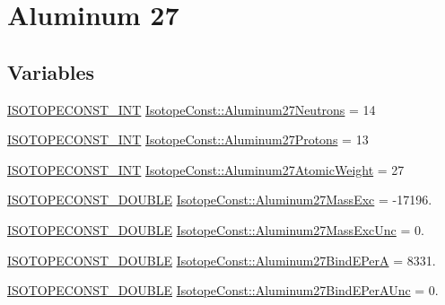 \hypertarget{group___isotope_const-_aluminum-_al27}{}\section{Aluminum 27}
\label{group___isotope_const-_aluminum-_al27}
\subsection*{Variables}
\begin{DoxyCompactItemize}
\item 
\mbox{\hyperlink{group___isotope_const-_macros_ga5f18360b3e99483a35c32d789e62621c}{I\+S\+O\+T\+O\+P\+E\+C\+O\+N\+S\+T\+\_\+\+I\+NT}} \mbox{\hyperlink{group___isotope_const-_aluminum-_al27_ga31e6e90dbeca94a5b2ed8e8935a1dfcc}{Isotope\+Const\+::\+Aluminum27\+Neutrons}} = 14
\item 
\mbox{\hyperlink{group___isotope_const-_macros_ga5f18360b3e99483a35c32d789e62621c}{I\+S\+O\+T\+O\+P\+E\+C\+O\+N\+S\+T\+\_\+\+I\+NT}} \mbox{\hyperlink{group___isotope_const-_aluminum-_al27_gabac87c2736616b008bdb04b44e209bfa}{Isotope\+Const\+::\+Aluminum27\+Protons}} = 13
\item 
\mbox{\hyperlink{group___isotope_const-_macros_ga5f18360b3e99483a35c32d789e62621c}{I\+S\+O\+T\+O\+P\+E\+C\+O\+N\+S\+T\+\_\+\+I\+NT}} \mbox{\hyperlink{group___isotope_const-_aluminum-_al27_gaf1c6ac9d88bcbaca1fdd812d435c244d}{Isotope\+Const\+::\+Aluminum27\+Atomic\+Weight}} = 27
\item 
\mbox{\hyperlink{group___isotope_const-_macros_ga8f45a7272ce02c0b4c65c44636ed719a}{I\+S\+O\+T\+O\+P\+E\+C\+O\+N\+S\+T\+\_\+\+D\+O\+U\+B\+LE}} \mbox{\hyperlink{group___isotope_const-_aluminum-_al27_ga844cb2a7dec51cfde46a1913274e6197}{Isotope\+Const\+::\+Aluminum27\+Mass\+Exc}} = -\/17196.
\item 
\mbox{\hyperlink{group___isotope_const-_macros_ga8f45a7272ce02c0b4c65c44636ed719a}{I\+S\+O\+T\+O\+P\+E\+C\+O\+N\+S\+T\+\_\+\+D\+O\+U\+B\+LE}} \mbox{\hyperlink{group___isotope_const-_aluminum-_al27_ga75847cfca9ed48917eca2500216141b9}{Isotope\+Const\+::\+Aluminum27\+Mass\+Exc\+Unc}} = 0.
\item 
\mbox{\hyperlink{group___isotope_const-_macros_ga8f45a7272ce02c0b4c65c44636ed719a}{I\+S\+O\+T\+O\+P\+E\+C\+O\+N\+S\+T\+\_\+\+D\+O\+U\+B\+LE}} \mbox{\hyperlink{group___isotope_const-_aluminum-_al27_ga8e2358765ea3ec903fefbe3c5a71d95b}{Isotope\+Const\+::\+Aluminum27\+Bind\+E\+PerA}} = 8331.
\item 
\mbox{\hyperlink{group___isotope_const-_macros_ga8f45a7272ce02c0b4c65c44636ed719a}{I\+S\+O\+T\+O\+P\+E\+C\+O\+N\+S\+T\+\_\+\+D\+O\+U\+B\+LE}} \mbox{\hyperlink{group___isotope_const-_aluminum-_al27_gae7df84ac98e46592f021ec290ae6a9f6}{Isotope\+Const\+::\+Aluminum27\+Bind\+E\+Per\+A\+Unc}} = 0.

\end{DoxyCompactItemize}
